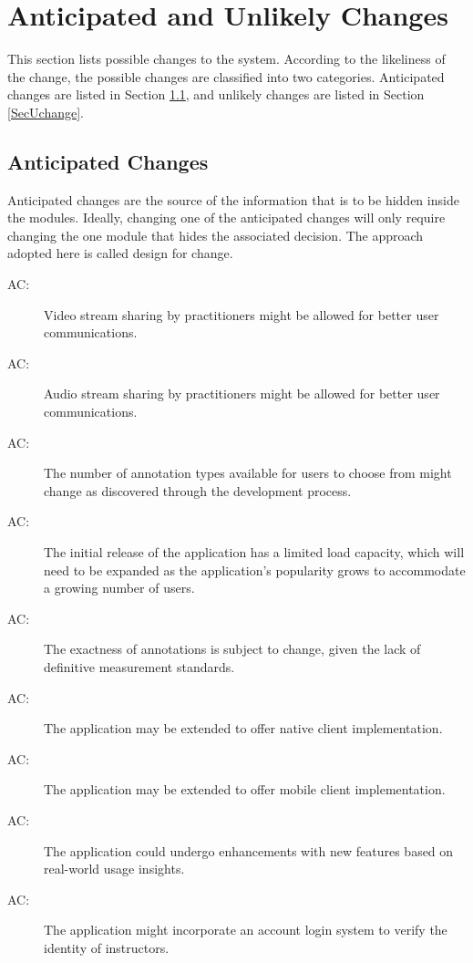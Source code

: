 \documentclass[12pt, titlepage]{article}
\newcounter{acnum}
\newcommand{\actheacnum}{AC\theacnum}
\begin{document}
\section{Anticipated and Unlikely Changes} \label{SecChange}

This section lists possible changes to the system. According to the likeliness
of the change, the possible changes are classified into two
categories. Anticipated changes are listed in Section \ref{SecAchange}, and
unlikely changes are listed in Section \ref{SecUchange}.

\subsection{Anticipated Changes} \label{SecAchange}

Anticipated changes are the source of the information that is to be hidden
inside the modules. Ideally, changing one of the anticipated changes will only
require changing the one module that hides the associated decision. The approach
adopted here is called design for change.

\begin{description}
\item[ \actheacnum :] Video stream sharing by practitioners might be allowed for better user communications.
\item[ \actheacnum :] Audio stream sharing by practitioners might be allowed for better user communications.
\item[ \actheacnum :] The number of annotation types available for users to choose from might change as discovered through the development process.

\item[ \actheacnum :] The initial release of the application has a limited load capacity, which will need to be expanded as the application's popularity grows to accommodate a growing number of users.

\item[ \actheacnum :] The exactness of annotations is subject to change, given the lack of definitive measurement standards.

\item[ \actheacnum :] The application may be extended to offer native client implementation.

\item[ \actheacnum :] The application may be extended to offer mobile client implementation.
\item[ \actheacnum :] The application could undergo enhancements with new features based on real-world usage insights.
\item[ \actheacnum :] The application might incorporate an account login system to verify the identity of instructors.
\end{description}
\end{document}
